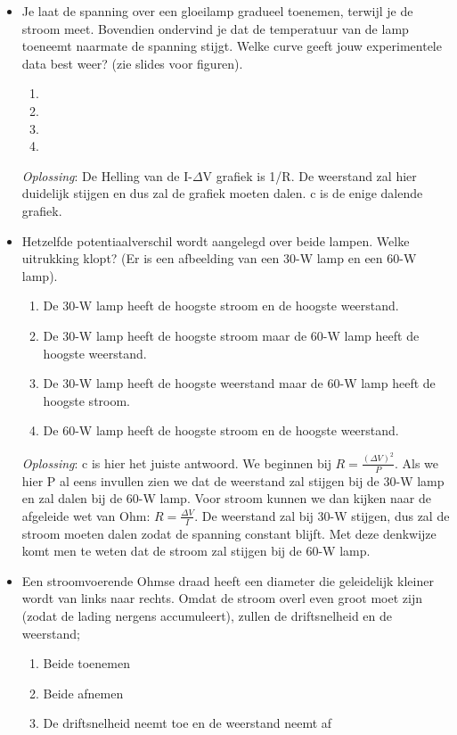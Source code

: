 \documentclass[12pt,a4paper]{article}
\begin{document}
\begin{itemize}
	\item Je laat de spanning over een gloeilamp gradueel toenemen, terwijl je de stroom meet. Bovendien ondervind je dat de temperatuur van de lamp toeneemt naarmate de spanning stijgt. Welke curve geeft jouw experimentele data best weer? (zie slides voor figuren).
	\begin{enumerate}[label=\alph*]
		\item 
		\item 
		\item 
		\item 
	\end{enumerate}
	\textit{Oplossing}: De Helling van de I-$\Delta$V grafiek is 1/R. De weerstand zal hier duidelijk stijgen en dus zal de grafiek moeten dalen. c is de enige dalende grafiek. 
	\item Hetzelfde potentiaalverschil wordt aangelegd over beide lampen. Welke uitrukking klopt? (Er is een afbeelding van een 30-W lamp en een 60-W lamp).
	\begin{enumerate}[label=\alph*]
		\item De 30-W lamp heeft de hoogste stroom en de hoogste weerstand. 
		\item De 30-W lamp heeft de hoogste stroom maar de 60-W lamp heeft de hoogste weerstand.
		\item De 30-W lamp heeft de hoogste weerstand maar de 60-W lamp heeft de hoogste stroom. 
		\item De 60-W lamp heeft de hoogste stroom en de hoogste weerstand. 
	\end{enumerate}
	\textit{Oplossing}: c is hier het juiste antwoord. We beginnen bij \(R = \frac{(\Delta V)^2}{P}\). Als we hier P al eens invullen zien we dat de weerstand zal stijgen bij de 30-W lamp en zal dalen bij de 60-W lamp. Voor stroom kunnen we dan kijken naar de afgeleide wet van Ohm: \(R = \frac{\Delta V}{I}\). De weerstand zal bij 30-W stijgen, dus zal de stroom moeten dalen zodat de spanning constant blijft. Met deze denkwijze komt men te weten dat de stroom zal stijgen bij de 60-W lamp. 
	\item Een stroomvoerende Ohmse draad heeft een diameter die geleidelijk kleiner wordt van links naar rechts. Omdat de stroom overl even groot moet zijn (zodat de lading nergens accumuleert), zullen de driftsnelheid en de weerstand;
	\begin{enumerate}[label=\alph*]
		\item Beide toenemen
		\item Beide afnemen
		\item De driftsnelheid neemt toe en de weerstand neemt af

\end{enumerate}
\end{itemize}
\end{document}
